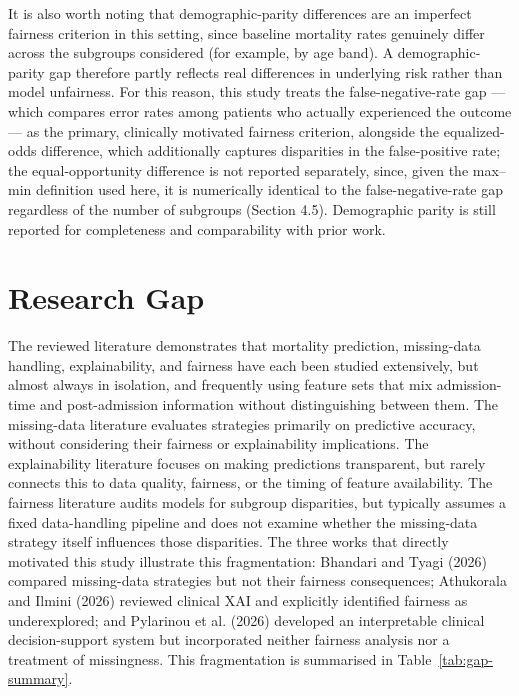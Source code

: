 \documentclass[12pt,a4paper]{report}
\begin{document}
It is also worth noting that demographic-parity differences are an imperfect fairness criterion in this setting, since baseline mortality rates genuinely differ across the subgroups considered (for example, by age band). A demographic-parity gap therefore partly reflects real differences in underlying risk rather than model unfairness. For this reason, this study treats the false-negative-rate gap --- which compares error rates among patients who actually experienced the outcome --- as the primary, clinically motivated fairness criterion, alongside the equalized-odds difference, which additionally captures disparities in the false-positive rate; the equal-opportunity difference is not reported separately, since, given the max--min definition used here, it is numerically identical to the false-negative-rate gap regardless of the number of subgroups (Section 4.5). Demographic parity is still reported for completeness and comparability with prior work.


\section{Research Gap}
The reviewed literature demonstrates that mortality prediction, missing-data handling, explainability, and fairness have each been studied extensively, but almost always in isolation, and frequently using feature sets that mix admission-time and post-admission information without distinguishing between them. The missing-data literature evaluates strategies primarily on predictive accuracy, without considering their fairness or explainability implications. The explainability literature focuses on making predictions transparent, but rarely connects this to data quality, fairness, or the timing of feature availability. The fairness literature audits models for subgroup disparities, but typically assumes a fixed data-handling pipeline and does not examine whether the missing-data strategy itself influences those disparities. The three works that directly motivated this study illustrate this fragmentation: Bhandari and Tyagi (2026) compared missing-data strategies but not their fairness consequences; Athukorala and Ilmini (2026) reviewed clinical XAI and explicitly identified fairness as underexplored; and Pylarinou et al. (2026) developed an interpretable clinical decision-support system but incorporated neither fairness analysis nor a treatment of missingness. This fragmentation is summarised in Table~\ref{tab:gap-summary}.
\end{document}
